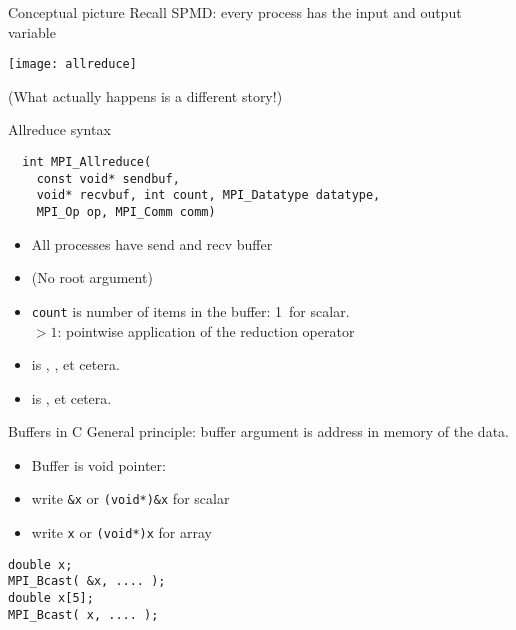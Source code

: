 \begin{numberedframe}{Conceptual picture}
  Recall SPMD: every process has the input and output variable

  \texttt{[image: allreduce]}

  (What actually happens is a different story!)
\end{numberedframe}

\begin{numberedframe}{Allreduce syntax}
\begin{lstlisting}
  int MPI_Allreduce(
    const void* sendbuf,
    void* recvbuf, int count, MPI_Datatype datatype,
    MPI_Op op, MPI_Comm comm)  
\end{lstlisting}
\begin{itemize}
\item All processes have send and recv buffer
\item (No root argument)
\item \lstinline{count} is number of items in the buffer: 1~for scalar.\\
  $>1$: pointwise application of the reduction operator
\item {} is , ,
   et cetera.
\item {} is ,  et cetera.
\end{itemize}
\end{numberedframe}

\begin{exerciseframe}[randommax]
  
\end{exerciseframe}

\begin{exerciseframe}
  
\end{exerciseframe}

\begin{mpl}
  \addtocounter{slidecount}{-1}
\end{mpl}


\begin{c}
\begin{numberedframe}{Buffers in C}
  General principle: buffer argument is address in memory of the data.
  \begin{itemize}
  \item Buffer is void pointer: 
  \item write \lstinline{&x} or \lstinline{(void*)&x} for scalar
  \item write \lstinline{x} or \lstinline{(void*)x} for array
  \end{itemize}
\begin{lstlisting}
double x;
MPI_Bcast( &x, .... );
double x[5];
MPI_Bcast( x, .... );
\end{lstlisting}
\end{numberedframe}
\end{c}

